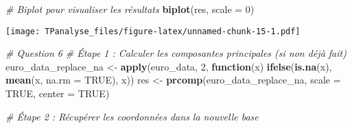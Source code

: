\documentclass[
]{article}
\newenvironment{Shaded}{\begin{snugshade}}{\end{snugshade}}
\newcommand{\AttributeTok}[1]{\textcolor[rgb]{0.13,0.29,0.53}{#1}}
\newcommand{\CommentTok}[1]{\textcolor[rgb]{0.56,0.35,0.01}{\textit{#1}}}
\newcommand{\ConstantTok}[1]{\textcolor[rgb]{0.56,0.35,0.01}{#1}}
\newcommand{\ControlFlowTok}[1]{\textcolor[rgb]{0.13,0.29,0.53}{\textbf{#1}}}
\newcommand{\DecValTok}[1]{\textcolor[rgb]{0.00,0.00,0.81}{#1}}
\newcommand{\FloatTok}[1]{\textcolor[rgb]{0.00,0.00,0.81}{#1}}
\newcommand{\FunctionTok}[1]{\textcolor[rgb]{0.13,0.29,0.53}{\textbf{#1}}}
\newcommand{\NormalTok}[1]{#1}
\newcommand{\OtherTok}[1]{\textcolor[rgb]{0.56,0.35,0.01}{#1}}
\newcommand{\SpecialCharTok}[1]{\textcolor[rgb]{0.81,0.36,0.00}{\textbf{#1}}}
\newcommand{\StringTok}[1]{\textcolor[rgb]{0.31,0.60,0.02}{#1}}
\begin{document}
\begin{Shaded}
\begin{Highlighting}[]
\CommentTok{\# Biplot pour visualiser les résultats}
\FunctionTok{biplot}\NormalTok{(res, }\AttributeTok{scale =} \DecValTok{0}\NormalTok{)}
\end{Highlighting}
\end{Shaded}

\texttt{[image: TPanalyse\_files/figure-latex/unnamed-chunk-15-1.pdf]}

\begin{Shaded}
\begin{Highlighting}[]
\CommentTok{\# Question 6 }
\CommentTok{\# Étape 1 : Calculer les composantes principales (si non déjà fait)}
\NormalTok{euro\_data\_replace\_na }\OtherTok{\textless{}{-}} \FunctionTok{apply}\NormalTok{(euro\_data, }\DecValTok{2}\NormalTok{, }\ControlFlowTok{function}\NormalTok{(x) }\FunctionTok{ifelse}\NormalTok{(}\FunctionTok{is.na}\NormalTok{(x), }\FunctionTok{mean}\NormalTok{(x, }\AttributeTok{na.rm =} \ConstantTok{TRUE}\NormalTok{), x))}
\NormalTok{res }\OtherTok{\textless{}{-}} \FunctionTok{prcomp}\NormalTok{(euro\_data\_replace\_na, }\AttributeTok{scale =} \ConstantTok{TRUE}\NormalTok{, }\AttributeTok{center =} \ConstantTok{TRUE}\NormalTok{)}

\CommentTok{\# Étape 2 : Récupérer les coordonnées dans la nouvelle base}
\end{Highlighting}
\end{Shaded}

\begin{Shaded}
\end{Shaded}
\end{document}
